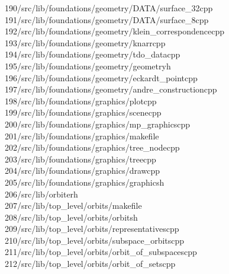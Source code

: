 \begin{tabbing}
190\>/src/lib/foundations/geometry/DATA/surface\_32cpp\\[0pt]
191\>/src/lib/foundations/geometry/DATA/surface\_8cpp\\[0pt]
192\>/src/lib/foundations/geometry/klein\_correspondencecpp\\[0pt]
193\>/src/lib/foundations/geometry/knarrcpp\\[0pt]
194\>/src/lib/foundations/geometry/tdo\_datacpp\\[0pt]
195\>/src/lib/foundations/geometry/geometryh\\[0pt]
196\>/src/lib/foundations/geometry/eckardt\_pointcpp\\[0pt]
197\>/src/lib/foundations/geometry/andre\_constructioncpp\\[0pt]
198\>/src/lib/foundations/graphics/plotcpp\\[0pt]
199\>/src/lib/foundations/graphics/scenecpp\\[0pt]
200\>/src/lib/foundations/graphics/mp\_graphicscpp\\[0pt]
201\>/src/lib/foundations/graphics/makefile\\[0pt]
202\>/src/lib/foundations/graphics/tree\_nodecpp\\[0pt]
203\>/src/lib/foundations/graphics/treecpp\\[0pt]
204\>/src/lib/foundations/graphics/drawcpp\\[0pt]
205\>/src/lib/foundations/graphics/graphicsh\\[0pt]
206\>/src/lib/orbiterh\\[0pt]
207\>/src/lib/top\_level/orbits/makefile\\[0pt]
208\>/src/lib/top\_level/orbits/orbitsh\\[0pt]
209\>/src/lib/top\_level/orbits/representativescpp\\[0pt]
210\>/src/lib/top\_level/orbits/subspace\_orbitscpp\\[0pt]
211\>/src/lib/top\_level/orbits/orbit\_of\_subspacescpp\\[0pt]
212\>/src/lib/top\_level/orbits/orbit\_of\_setscpp\\[0pt]

\end{tabbing}
